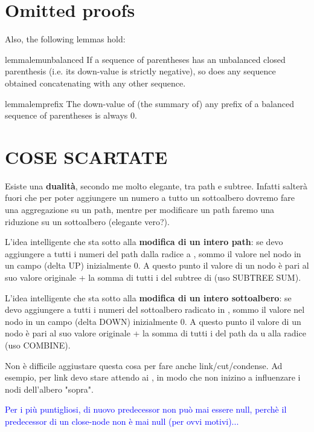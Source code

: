 \documentclass[a4paper,USenglish]{lipics}
\begin{document}
\iffalse 
\section{Omitted proofs}

		Also, the following lemmas hold:
\begin{restatable}{lemma}{lemunbalanced}
			If a sequence  of parentheses has an unbalanced closed parenthesis (i.e. its down-value is strictly negative), so does any sequence obtained concatenating  with any other sequence.
\end{restatable}
\begin{restatable}{lemma}{lemprefix}
			The down-value of (the summary of) any prefix of a balanced sequence of parentheses is always 0.
\end{restatable}

\balancedseq*
\sumofsummaries*
\summarysumassociativity*
\lemfather*
\lemunbalanced*
\lemprefix*
\lemimpact*
\bc*


\section{COSE SCARTATE}

	Esiste una \textbf{dualità}, secondo me molto elegante, tra path e subtree. Infatti salterà fuori che per poter aggiungere un numero a tutto un sottoalbero dovremo fare una aggregazione su un path, mentre per modificare un path faremo una riduzione su un sottoalbero (elegante vero?).

	L'idea intelligente che sta sotto alla \textbf{modifica di un intero path}: se devo aggiungere  a tutti i numeri del path dalla radice a , sommo il valore  nel nodo  in un campo  (delta UP) inizialmente 0. A questo punto il valore di un nodo  è pari al suo valore originale + la somma di tutti i  del subtree di  (uso SUBTREE SUM).

	L'idea intelligente che sta sotto alla \textbf{modifica di un intero sottoalbero}: se devo aggiungere  a tutti i numeri del sottoalbero radicato in , sommo il valore  nel nodo  in un campo  (delta DOWN) inizialmente 0. A questo punto il valore di un nodo  è pari al suo valore originale + la somma di tutti i  del path da u alla radice (uso COMBINE).

	Non è difficile aggiustare questa cosa per fare anche link/cut/condense. Ad esempio, per link devo stare attendo ai , in modo che non inizino a influenzare i nodi dell'albero "sopra".


			\textcolor{blue}{Per i più puntigliosi, di nuovo predecessor non può mai essere null, perchè il predecessor di un close-node non è mai null (per ovvi motivi)...}
\end{document}
